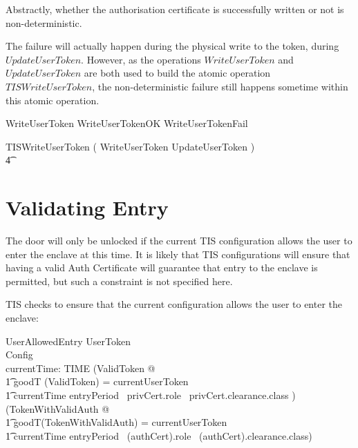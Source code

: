 Abstractly, whether the authorisation certificate is successfully
written or not is non-deterministic.   

The failure will actually happen during the physical write to the
token, during $UpdateUserToken$. However, as the
operations $WriteUserToken$ and $UpdateUserToken$ are both used to
build the atomic operation $TISWriteUserToken$, the non-deterministic 
failure still happens sometime within this atomic operation.

\begin{zed}
WriteUserToken  WriteUserTokenOK \lor WriteUserTokenFail
\end{zed}

\begin{zed}
        TISWriteUserToken  (
        WriteUserToken \semi UpdateUserToken )
\\ \t4          \lor [~ UserTokenTorn | status = waitingUpdateToken ~] 
\end{zed}



\section{Validating Entry}

The door will only be unlocked if the current TIS configuration allows
the user to enter the enclave at this time. It is likely that TIS
configurations will ensure that having a valid Auth Certificate will
guarantee that entry to the enclave is permitted, but such a
constraint is not specified here. 

TIS checks to ensure that the current configuration allows the user to
enter the enclave:


\begin{schema}{UserAllowedEntry}
        UserToken
\\      Config
\\      currentTime: TIME
\where
        (\exists ValidToken @ 
\\ \t1  goodT (\theta ValidToken) = currentUserToken
\\ \t1  \land currentTime \in entryPeriod~ privCert.role~
privCert.clearance.class )
\\ \lor
        (\exists TokenWithValidAuth @ 
\\ \t1 goodT(\theta TokenWithValidAuth) = currentUserToken 
\\ \t1 \land currentTime \in entryPeriod~
        (\The authCert).role~ (\The authCert).clearance.class)
\end{schema}


